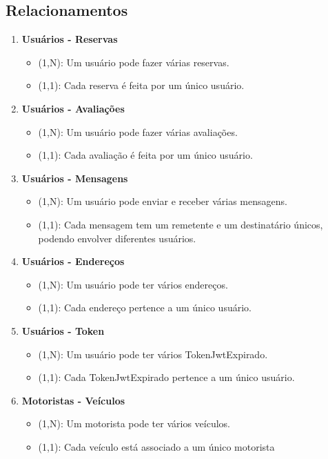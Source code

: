 
\subsection{Relacionamentos}

\begin{enumerate}
	
	
	\item \textbf{Usuários - Reservas}
	\begin{itemize}
		\item (1,N): Um usuário pode fazer várias reservas.
		\item (1,1): Cada reserva é feita por um único usuário.
	\end{itemize}
	
	\item \textbf{Usuários - Avaliações}
	\begin{itemize}
		\item (1,N): Um usuário pode fazer várias avaliações.
		\item (1,1): Cada avaliação é feita por um único usuário.
	\end{itemize}	
	
		\item \textbf{Usuários - Mensagens}
	\begin{itemize}
		\item (1,N): Um usuário pode enviar e receber várias mensagens.
		\item (1,1): Cada mensagem tem um remetente e um destinatário únicos, podendo envolver diferentes usuários.
	\end{itemize}
	
		\item \textbf{Usuários - Endereços}
	\begin{itemize}
		\item (1,N): Um usuário pode ter vários endereços.
		\item (1,1): Cada endereço pertence a um único usuário.
	\end{itemize}
	
		\item \textbf{Usuários - Token}
	\begin{itemize}
		\item (1,N): Um usuário pode ter vários TokenJwtExpirado.
		\item (1,1): Cada TokenJwtExpirado pertence a um único usuário.
	\end{itemize}
	
	\item \textbf{Motoristas - Veículos}
	\begin{itemize}
		\item (1,N): Um motorista pode ter vários veículos.
		\item (1,1): Cada veículo está associado a um único motorista
	\end{itemize}
	

\end{enumerate}
